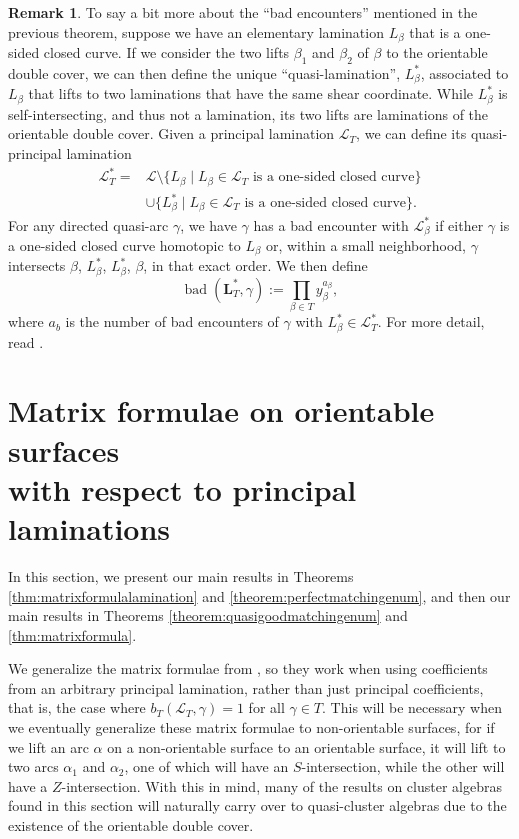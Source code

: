 \documentclass[10pt,a4paper]{amsart}
\numberwithin{equation}{section}
\theoremstyle{definition}
\newtheorem{Remark}[Theorem]{Remark}
\begin{document}
\begin{Remark}
 To say a bit more about the ``bad encounters'' mentioned in the previous theorem, suppose we have an elementary lamination $L_{\beta}$ that is a one-sided closed curve. If we consider the two lifts $\beta_1$ and $\beta_2$ of $\beta$ to the orientable double cover, we can then define the unique ``quasi-lamination'', $L^*_{\beta}$, associated to $L_{\beta}$ that lifts to two laminations that have the same shear coordinate. While $L^*_{\beta}$ is self-intersecting, and thus not a lamination, its two lifts are laminations of the orientable double cover.
 Given a principal lamination $\mathcal{L}_T$, we can define its quasi-principal lamination
 \begin{align*}
 \mathcal{L}_T^*={}&\mathcal{L}\setminus \{ L_{\beta} \mid L_{\beta}\in\mathcal{L}_{T} \text{ is a one-sided closed curve}\}\\
 &\cup \{ L^*_{\beta} \mid L_{\beta}\in\mathcal{L}_{T} \text{ is a one-sided closed curve}\}.
 \end{align*}
For any directed quasi-arc $\gamma$, we have $\gamma$ has a bad encounter with $\mathcal{L}^*_{\beta}$ if either $\gamma$ is a one-sided closed curve homotopic to $L_{\beta}$ or, within a small neighborhood, $\gamma$ intersects $\beta$, $L^*_{\beta}$, $L^*_{\beta}$, $\beta$, in that exact order. We then define
 \[\operatorname{bad}(\mathcal{\textbf{L}}_T^*, \gamma):=\prod_{\beta\in T} y_{\beta}^{a_{\beta}},\] where $a_b$ is the number of bad encounters of $\gamma$ with $L^*_{\beta}\in \mathcal{L}^*_T$. For more detail, read \cite[Section~5.3.2]{Wil19}.
\end{Remark}

\section[Matrix formulae on orientable surfaces with respect to principal laminations]{Matrix formulae on orientable surfaces\\ with respect to principal laminations}\label{section:matrixorientable}

In this section, we present our main results in Theorems \ref{thm:matrixformulalamination} and \ref{theorem:perfectmatchingenum}, and then our main results in Theorems \ref{theorem:quasigoodmatchingenum} and \ref{thm:matrixformula}.

We generalize the matrix formulae from \cite{MW13}, so they work when using coefficients from an arbitrary principal lamination, rather than just principal coefficients, that is, the case where ${b_T(\mathcal{L}_T, \gamma)=1}$ for all $\gamma\in T$. This will be necessary when we eventually generalize these matrix formulae to non-orientable surfaces, for if we lift an arc $\alpha$ on a non-orientable surface to an orientable surface, it will lift to two arcs $\alpha_1$ and $\alpha_2$, one of which will have an $S$-intersection, while the other will have a $Z$-intersection. With this in mind, many of the results on cluster algebras found in this section will naturally carry over to quasi-cluster algebras due to the existence of the orientable double cover.
\end{document}
